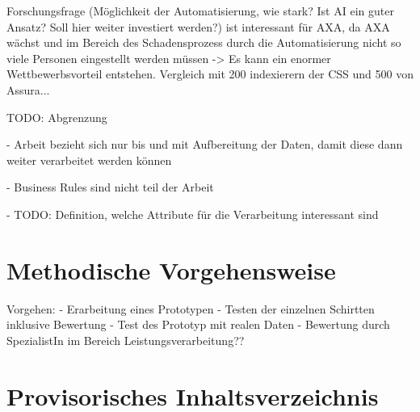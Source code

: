 \documentclass[12pt]{extarticle}
\begin{document}

Forschungsfrage (Möglichkeit der Automatisierung, wie stark? Ist AI ein guter Ansatz? Soll hier weiter investiert werden?) ist interessant für AXA, da AXA wächst und im Bereich des Schadensprozess durch die Automatisierung nicht so viele Personen eingestellt werden müssen -> Es kann ein enormer Wettbewerbsvorteil entstehen. Vergleich mit 200 indexierern der CSS und 500 von Assura...

TODO: Abgrenzung

- Arbeit bezieht sich nur bis und mit Aufbereitung der Daten, damit diese dann weiter verarbeitet werden können

- Business Rules sind nicht teil der Arbeit

- TODO: Definition, welche Attribute für die Verarbeitung interessant sind

\section{Methodische Vorgehensweise}

 
Vorgehen:
- Erarbeitung eines Prototypen
- Testen der einzelnen Schirtten inklusive Bewertung
- Test des Prototyp mit realen Daten
- Bewertung durch SpezialistIn im Bereich Leistungsverarbeitung??
 
\section{Provisorisches Inhaltsverzeichnis} 
\end{document}

